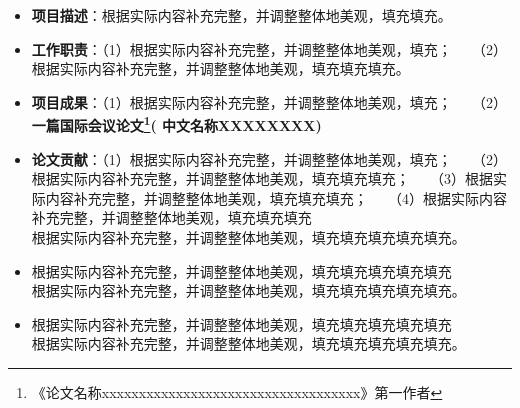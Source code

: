 \documentclass[10pt,a4paper,ragged2e,withhyper]{altacv}
\begin{document}
\begin{paracol}{2}
\begin{itemize}
	\item \textbf{项目描述}：根据实际内容补充完整，并调整整体地美观，填充填充。
	\item \textbf{工作职责}：（1）根据实际内容补充完整，并调整整体地美观，填充；
	$~~~~~$（2）根据实际内容补充完整，并调整整体地美观，填充填充填充。
	\item \textbf{项目成果}：（1）根据实际内容补充完整，并调整整体地美观，填充；
	$~~~~~$（2）\textbf{一篇{\color{red}{~CCF-X~}}国际会议论文\footnote{《论文名称xxxxxxxxxxxxxxxxxxxxxxxxxxxxxxxxxxx》第一作者}({\color{red}{XXXX 2024}} 中文名称XXXXXXXX)}
	\item \textbf{论文贡献}：（1）根据实际内容补充完整，并调整整体地美观，填充；
	$~~~~~$（2）根据实际内容补充完整，并调整整体地美观，填充填充填充；
	$~~~~~$（3）根据实际内容补充完整，并调整整体地美观，填充填充填充；
	$~~~~~$（4）根据实际内容补充完整，并调整整体地美观，填充填充填充\\
	根据实际内容补充完整，并调整整体地美观，填充填充填充填充填充。
\end{itemize}



\begin{itemize}
	\item 根据实际内容补充完整，并调整整体地美观，填充填充填充填充填充\\
	根据实际内容补充完整，并调整整体地美观，填充填充填充填充填充。
	\item 根据实际内容补充完整，并调整整体地美观，填充填充填充填充填充\\
	根据实际内容补充完整，并调整整体地美观，填充填充填充填充填充。
\end{itemize}

\medskip




\switchcolumn


\vspace{-0.0mm}


\end{paracol}
\end{document}
